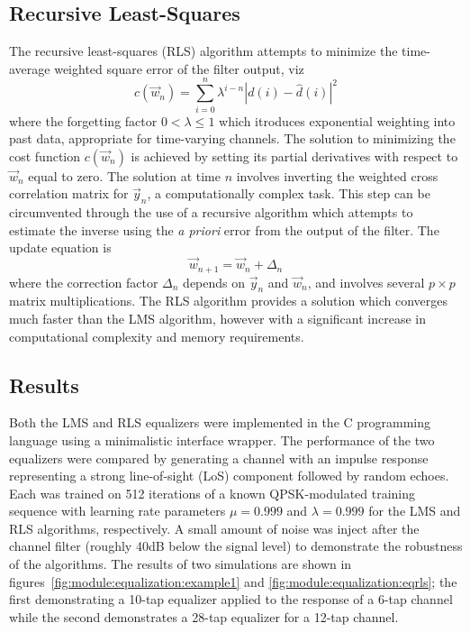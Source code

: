 \subsection{Recursive Least-Squares}
The recursive least-squares (RLS) algorithm attempts to minimize the
time-average weighted square error of the filter output, viz
\begin{equation}
c(\vec{w}_n) = \sum\limits_{i=0}^{n}{ \lambda^{i-n} \left| d(i)-\hat{d}(i)\right|^2 }
\end{equation}
where the forgetting factor $0<\lambda\leq 1$ which itroduces exponential
weighting into past data, appropriate for time-varying channels.
The solution to minimizing the cost function $c(\vec{w}_n)$ is achieved by
setting its partial derivatives with respect to $\vec{w}_n$ equal to zero.
The solution at time $n$ involves inverting the weighted cross correlation
matrix for $\vec{y}_n$, a computationally complex task.
This step can be circumvented through the use of a recursive algorithm which
attempts to estimate the inverse using the {\it a priori} error from the
output of the filter.
The update equation is
\begin{equation}
\label{eq:rls:weight_update}
\vec{w}_{n+1} = \vec{w}_n + \Delta_{n}
\end{equation}
where the correction factor $\Delta_{n}$ depends on $\vec{y}_n$ and $\vec{w}_n$,
and involves several $p \times p$ matrix multiplications.
The RLS algorithm provides a solution which converges much faster than the LMS
algorithm, however with a significant increase in computational complexity and
memory requirements.

\subsection{Results}
Both the LMS and RLS equalizers were implemented in the C programming
language using a minimalistic interface wrapper.
The performance of the two equalizers were compared by generating a channel
with an impulse response representing a strong line-of-sight (LoS) component
followed by random echoes.
Each was trained on 512 iterations of a known QPSK-modulated training sequence with learning
rate parameters $\mu=0.999$ and $\lambda=0.999$ for the LMS and RLS algorithms,
respectively.
A small amount of noise was inject after the channel filter (roughly 40dB
below the signal level) to demonstrate the robustness of the algorithms.
The results of two simulations are shown in
figures~\ref{fig:module:equalization:example1} and \ref{fig:module:equalization:eqrls};
the first demonstrating a 10-tap equalizer applied to the response of a 6-tap
channel while the second demonstrates a 28-tap equalizer for a 12-tap
channel.

